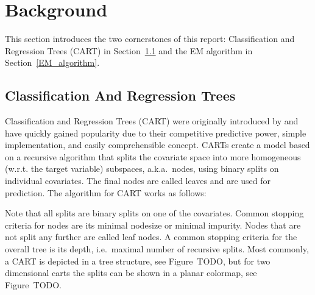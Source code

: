 \documentclass[12pt, twoside]{article}
\newcommand{\1}{\mathbb{1}}
\begin{document}
\section{Background}
This section introduces the two cornerstones of this report: Classification and Regression Trees (CART) in Section~\ref{CART} and the EM algorithm in Section~\ref{EM_algorithm}. 

\subsection{Classification And Regression Trees}\label{CART}
Classification and Regression Trees (CART) were originally introduced by \cite{breiman1984} and have quickly gained popularity due to their competitive predictive power, simple implementation, and easily comprehensible concept.
CARTs create a model based on a recursive algorithm that splits the covariate space into more homogeneous (w.r.t. the target variable) subspaces, a.k.a.\ nodes, using binary splits on individual covariates. The final nodes are called leaves and are used for prediction.
The algorithm for CART works as follows:


Note that all splits are binary splits on one of the covariates. Common stopping criteria for nodes are its minimal nodesize or minimal impurity. Nodes that are not split any further are called leaf nodes.
A common stopping criteria for the overall tree is its depth, i.e.\ maximal number of recursive splits. 
Most commonly, a CART is depicted in a tree structure, see Figure~TODO, but for two dimensional carts the splits can be shown in a planar colormap, see Figure~TODO.
\end{document}
